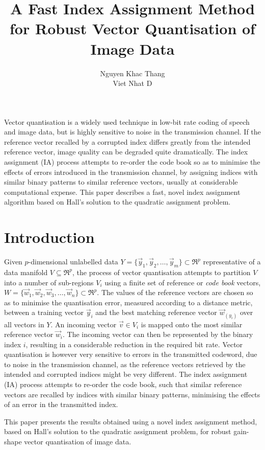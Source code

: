 \documentclass[12pt,a4paper]{report}
\title{A Fast Index Assignment Method for Robust Vector Quantisation of Image Data}
\author{Nguyen Khac Thang\\ Viet Nhat D}
\begin{document}
\maketitle
\tableofcontents
Vector quantisation is a widely used technique in low-bit rate coding of speech
and image data, but is highly sensitive to noise in the transmission channel.
If the reference vector recalled by a corrupted index differs greatly from the
intended reference vector, image quality can be degraded quite dramatically.
The index assignment (IA) process attempts to re-order the code book so as to
minimise the effects of errors introduced in the transmission channel, by
assigning indices with similar binary patterns to similar reference vectors,
usually at considerable computational expense.  This paper describes a fast,
novel index assignment algorithm based on Hall's solution to the quadratic
assignment problem.
\chapter{Introduction}
Given $p$-dimensional unlabelled data
$Y = \{\vec{y}_1, \vec{y}_2, \ldots, \vec{y}_m\}\subset\Re^p$ representative
of a data manifold $V \subseteq\Re^p$, the process
of vector quantisation attempts to partition $V$ into a number
of sub-regions $V_i$ using a finite set of reference or \emph{code book}
vectors, $W = \{\vec{w}_1, \vec{w}_2, \vec{w}_3, \ldots, \vec{w}_n\}
\subset\Re^p$.  The values of the reference vectors are chosen so as
to minimise the quantisation error, measured according to a distance metric,
between a training vector $\vec{y}_i$ and the best matching reference vector
$\vec{w}_{(y_i)}$ over all vectors in $Y$.  An incoming vector
$\vec{v} \in V_i$ is mapped onto the most similar reference vector
$\vec{w}_i$.  The incoming vector can then be represented by the binary index $i$,
resulting in a considerable reduction in the required bit rate.
Vector quantisation is however very sensitive to errors in the transmitted
codeword, due to noise in the transmission channel, as the reference vectors
retrieved by the intended and corrupted indices might be very different.  The
index assignment (IA) process attempts to re-order the code book, such that
similar reference vectors are recalled by indices with similar binary
patterns, minimising the effects of an error in the
transmitted index.

This paper presents the results obtained using a novel index assignment
method, based on Hall's solution to the quadratic
assignment problem, for robust gain-shape vector quantisation of
image data.
\end{document}
